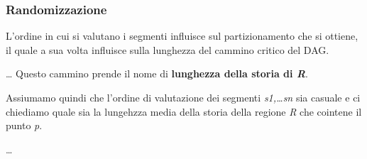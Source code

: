 \subsubsection{Randomizzazione}\label{randomizzazione}

L'ordine in cui si valutano i segmenti influisce sul partizionamento che
si ottiene, il quale a sua volta influisce sulla lunghezza del cammino
critico del DAG.

\ldots{} Questo cammino prende il nome di \textbf{lunghezza della storia
di \emph{R}}.

Assiumamo quindi che l'ordine di valutazione dei segmenti
\emph{s1,\ldots{}sn} sia casuale e ci chiediamo quale sia la lungehzza
media della storia della regione \emph{R} che cointene il punto
\emph{p}.

\ldots{}
